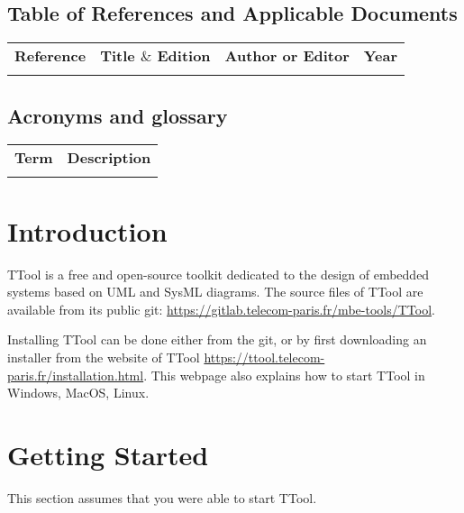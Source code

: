 \documentclass[12pt]{article}
\begin{document}
\subsection{Table of References and Applicable Documents}

\begin{table}[H]
\large
\centering
\begin{adjustbox}{width=\textwidth}
\begin{tabular}{ |p{2.66in}|p{2.66in}|p{0.95in}|p{0.43in}| }
\hhline{----}
\textbf{Reference} & \textbf{Title  $  \&  $  Edition} & \textbf{Author or
Editor} & \textbf{Year}
\\
\hhline{----}
 &  &  &  \\ 
\hline
\end{tabular}
\end{adjustbox}
\end{table}

\subsection{Acronyms and glossary}

\begin{table}[H]
\large
\centering
\begin{adjustbox}{width=\textwidth}
\begin{tabular}{ |p{1.24in}|p{5.45in}| }
\hhline{--}
\textbf{Term} & \textbf{Description} \\ 
\hhline{--}
 &  \\ 
\hline
\end{tabular}
\end{adjustbox}
\end{table}

\newpage
\section{Introduction}

TTool is a free and open-source toolkit dedicated to the design of embedded systems based on UML and SysML diagrams. The source files of TTool are available from its public git: \url{https://gitlab.telecom-paris.fr/mbe-tools/TTool}.

Installing TTool can be done either from the git, or by first downloading an installer from the website of TTool \url{https://ttool.telecom-paris.fr/installation.html}. This webpage also explains how to start TTool in Windows, MacOS, Linux.

\section{Getting Started}
This section assumes that you were able to start TTool.
\end{document}
